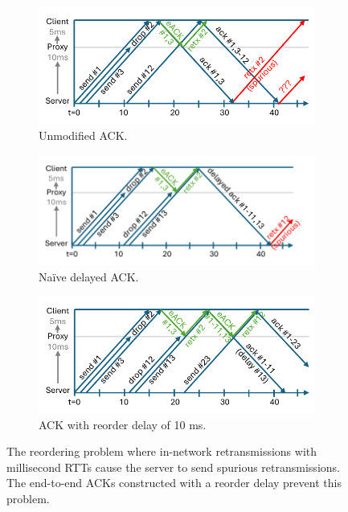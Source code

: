 \begin{figure}
    \centering
    \begin{subfigure}[b]{0.8\linewidth}
        \includegraphics[width=\linewidth, trim=0 10 0 10, clip]{figures/reordering_unmodified.pdf}
        \caption{Unmodified ACK.}
        \label{fig:reordering-problem:unmodified}
    \end{subfigure}
    \begin{subfigure}[b]{0.8\linewidth}
        \includegraphics[width=\linewidth, trim=0 9 0 10, clip]{figures/reordering_delayed_ack.pdf}
        \caption{Na\"ive delayed ACK.}
        \label{fig:reordering-problem:delayed-ack}
    \end{subfigure}
    \begin{subfigure}[b]{0.8\linewidth}
        \includegraphics[width=\linewidth, trim=0 9 0 10, clip]{figures/reordering_with_signal.pdf}
        \caption{ACK with \Sys reorder delay of 10 ms.}
        \label{fig:reordering-problem:packrat}
    \end{subfigure}
    \caption{\small The reordering problem where in-network retransmissions with
    millisecond RTTs cause the server to send spurious retransmissions. The
    end-to-end ACKs constructed with a \Sys reorder delay prevent this problem.
    \vspace{-0.4cm}
    }
    \label{fig:reordering-problem}
\end{figure}

